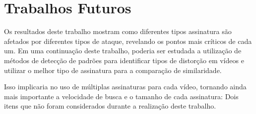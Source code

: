 \section{Trabalhos Futuros}
\label{sec:trabalhosFuturos}

Os resultados deste trabalho mostram como diferentes tipos assinatura são afetados por diferentes tipos de ataque, revelando os pontos mais críticos de cada um. Em uma continuação deste trabalho, poderia ser estudada a utilização de métodos de detecção de padrões para identificar tipos de distorção em vídeos e utilizar o melhor tipo de assinatura para a comparação de similaridade.

Isso implicaria no uso de múltiplas assinaturas para cada vídeo, tornando ainda mais importante a velocidade de busca e o tamanho de cada assinatura: Dois itens que não foram considerados durante a realização deste trabalho. 